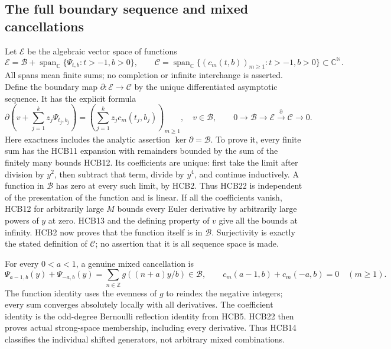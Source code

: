 \subsection{The full boundary sequence and mixed cancellations}

Let $\mathcal E$ be the algebraic vector space of functions
\begin{equation}\tag{HCB21}
 \mathcal E=\mathcal B+
       \operatorname{span}_{\mathbb C}\{\Psi_{t,b}:t>-1,b>0\},
 \qquad
 \mathcal C=\operatorname{span}_{\mathbb C}
       \{(c_m(t,b))_{m\geq1}:t>-1,b>0\}\subset\mathbb C^{\mathbb N}.
\end{equation}
All spans mean finite sums; no completion or infinite interchange
is asserted. Define the boundary map $\partial:\mathcal E\to
\mathcal C$ by the unique differentiated asymptotic sequence. It
has the explicit formula
\begin{equation}\tag{HCB22}
 \partial\left(v+\sum_{j=1}^k z_j\Psi_{t_j,b_j}\right)
    =\left(\sum_{j=1}^k z_jc_m(t_j,b_j)\right)_{m\geq1},
 \quad v\in\mathcal B,
 \qquad
 0\longrightarrow\mathcal B\longrightarrow\mathcal E
       \xrightarrow{\partial}\mathcal C\longrightarrow0.
\end{equation}
Here exactness includes the analytic assertion
$\ker\partial=\mathcal B$. To prove it, every finite sum has the
HCB11 expansion with remainders bounded by the sum of the finitely
many bounds HCB12. Its coefficients are unique: first take the
limit after division by $y^2$, then subtract that term, divide by
$y^4$, and continue inductively. A function in $\mathcal B$ has
zero at every such limit, by HCB2. Thus HCB22 is independent of
the presentation of the function and is linear. If all the
coefficients vanish, HCB12 for arbitrarily large $M$ bounds every
Euler derivative by arbitrarily large powers of $y$ at zero.
HCB13 and the defining property of $v$ give all the bounds at
infinity. HCB2 now proves that the function itself is in
$\mathcal B$. Surjectivity is exactly the stated definition of
$\mathcal C$; no assertion that it is all sequence space is made.

For every $0<a<1$, a genuine mixed cancellation is
\begin{equation}\tag{HCB23}
 \Psi_{a-1,b}(y)+\Psi_{-a,b}(y)
      =\sum_{n\in\mathbb Z}g((n+a)y/b)\in\mathcal B,
 \qquad c_m(a-1,b)+c_m(-a,b)=0\quad(m\geq1).
\end{equation}
The function identity uses the evenness of $g$ to reindex the
negative integers; every sum converges absolutely locally with all
derivatives. The coefficient identity is the odd-degree Bernoulli
reflection identity from HCB5. HCB22 then proves actual strong-space
membership, including every derivative. Thus HCB14 classifies the
individual shifted generators, not arbitrary mixed combinations.

